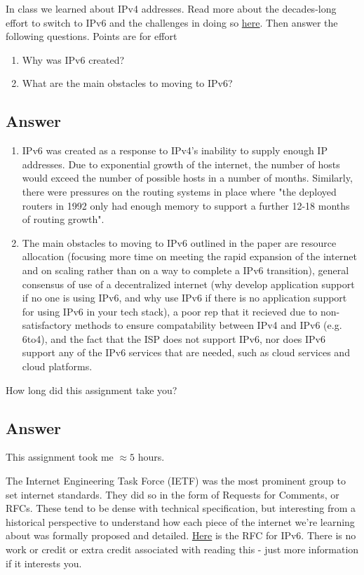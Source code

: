\documentclass[10pt]{article}
\newenvironment{problem}[2][Problem]{\begin{trivlist}
\item[\hskip \labelsep {\bfseries #1}\hskip \labelsep {\bfseries #2.}]}{\end{trivlist}}
\begin{document}
\begin{problem}{5: Reading}
In class we learned about IPv4 addresses. Read more about the decades-long effort to switch to IPv6 and the challenges in doing so \href{https://www.potaroo.net/ispcol/2022-05/when.html}{here}. Then answer the following questions. Points are for effort

\begin{enumerate}
    \item Why was IPv6 created? 
    \item What are the main obstacles to moving to IPv6?
\end{enumerate}
\subsection*{Answer}
\begin{enumerate}
    \item IPv6 was created as a response to IPv4's inability to supply enough IP addresses. Due to exponential growth of the internet, the number of hosts would exceed the number of possible hosts in a number of months. Similarly, there were pressures on the routing systems in place where "the deployed routers in 1992 only had enough memory to support a further 12-18 months of routing growth". 
    \item The main obstacles to moving to IPv6 outlined in the paper are resource allocation (focusing more time on meeting the rapid expansion of the internet and on scaling rather than on a way to complete a IPv6 transition), general consensus of use of a decentralized internet (why develop application support if no one is using IPv6, and why use IPv6 if there is no application support for using IPv6 in your tech stack), a poor rep that it recieved due to non-satisfactory methods to ensure compatability between IPv4 and IPv6 (e.g. 6to4), and the fact that the ISP does not support IPv6, nor does IPv6 support any of the IPv6 services that are needed, such as cloud services and cloud platforms.
\end{enumerate}

\end{problem}
\begin{problem}{6}
How long did this assignment take you?
\end{problem}
\subsection*{Answer}
This assignment took me $\approx 5$ hours.

\begin{problem}{7: Extra (optional) reading}
The Internet Engineering Task Force (IETF) was the most prominent group to set internet standards. They did so in the form of Requests for Comments, or RFCs. These tend to be dense with technical specification, but interesting from a historical perspective to understand how each piece of the internet we're learning about was formally proposed and detailed. \href{https://www.rfc-editor.org/rfc/rfc2460}{Here} is the RFC for IPv6. There is no work or credit or extra credit associated with reading this - just more information if it interests you. 
\end{problem}
\end{document}
